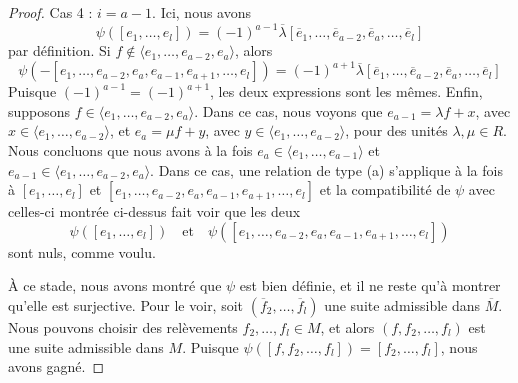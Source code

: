 \begin{proof}
\medskip\noindent
Cas 4 : $i = a - 1$. Ici, nous avons
$$
\psi([e_1, \ldots, e_l]) =
(-1)^{a - 1}
\overline{\lambda}
[\overline{e}_1,
\ldots,
\overline{e}_{a - 2},
\overline{e}_a,
\ldots,
\overline{e}_l]
$$
par définition. Si $f \not \in \langle e_1, \ldots, e_{a - 2}, e_a \rangle$,
alors
$$
\psi(-[e_1, \ldots, e_{a - 2}, e_a, e_{a - 1}, e_{a + 1}, \ldots, e_l]) =
(-1)^{a + 1}\overline{\lambda}
[\overline{e}_1,
\ldots,
\overline{e}_{a - 2},
\overline{e}_a,
\ldots,
\overline{e}_l]
$$
Puisque $(-1)^{a - 1} = (-1)^{a + 1}$, les deux expressions sont les mêmes.
Enfin, supposons $f \in \langle e_1, \ldots, e_{a - 2}, e_a \rangle$.
Dans ce cas, nous voyons que $e_{a - 1} = \lambda f + x$, avec
$x \in \langle e_1, \ldots, e_{a - 2}\rangle$, et
$e_a = \mu f + y$, avec $y \in \langle e_1, \ldots, e_{a - 2}\rangle$,
pour des unités $\lambda, \mu \in R$.
Nous concluons que nous avons à la fois
$e_a \in \langle e_1, \ldots, e_{a - 1} \rangle$ et
$e_{a - 1} \in \langle e_1, \ldots, e_{a - 2}, e_a\rangle$.
Dans ce cas, une relation de type (a) s'applique à la fois à
$[e_1, \ldots, e_l]$ et
$[e_1, \ldots, e_{a - 2}, e_a, e_{a - 1}, e_{a + 1}, \ldots, e_l]$
et la compatibilité de $\psi$ avec celles-ci montrée ci-dessus fait voir que les deux
$$
\psi([e_1, \ldots, e_l])
\quad\text{et}\quad
\psi([e_1, \ldots, e_{a - 2}, e_a, e_{a - 1}, e_{a + 1}, \ldots, e_l])
$$
sont nuls, comme voulu.

\medskip\noindent
À ce stade, nous avons montré que $\psi$ est bien définie, et il ne reste
qu'à montrer qu'elle est surjective. Pour le voir, soit
$(\overline{f}_2, \ldots, \overline{f}_l)$ une suite admissible
dans $\overline{M}$. Nous pouvons choisir des relèvements $f_2, \ldots, f_l \in M$, et
alors $(f, f_2, \ldots, f_l)$ est une suite admissible dans $M$.
Puisque $\psi([f, f_2, \ldots, f_l]) = [f_2, \ldots, f_l]$, nous avons gagné.
\end{proof}


